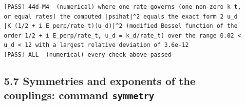 \documentclass[
  10pt,
]{article}
\begin{document}
\begin{verbatim}
[PASS] 44d-M4  (numerical) where one rate governs (one non-zero k_t, or equal rates) the computed |psihat|^2 equals the exact form 2 u_d |K_(1/2 + i E_perp/rate_t)(u_d)|^2 (modified Bessel function of the order 1/2 + i E_perp/rate_t, u_d = k_d/rate_t) over the range 0.02 < u_d < 12 with a largest relative deviation of 3.6e-12
[PASS] ALL  (numerical) every check above passed
\end{verbatim}

\hypertarget{symmetries-and-exponents-of-the-couplings-command-symmetry}{%
\subsection{\texorpdfstring{5.7 Symmetries and exponents of the
couplings: command
\texttt{symmetry}}{5.7 Symmetries and exponents of the couplings: command symmetry}}\label{symmetries-and-exponents-of-the-couplings-command-symmetry}}
\end{document}
